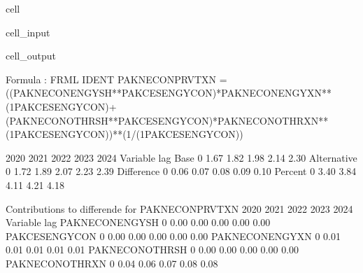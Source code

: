 \documentclass[letterpaper,10pt,english]{jupyterBook}
\begin{document}
\begin{sphinxuseclass}{cell}\begin{sphinxVerbatimInput}

\begin{sphinxuseclass}{cell_input}
\begin{sphinxVerbatim}[commandchars=\\\{\}]
\PYG{p}{[}\PYG{p}{]}
\end{sphinxVerbatim}

\end{sphinxuseclass}\end{sphinxVerbatimInput}
\begin{sphinxVerbatimOutput}

\begin{sphinxuseclass}{cell_output}
\begin{sphinxVerbatim}[commandchars=\\\{\}]
Formula        : FRML \PYGZlt{}IDENT\PYGZgt{} PAKNECONPRVTXN = ((PAKNECONENGYSH**PAKCESENGYCON)*PAKNECONENGYXN**(1\PYGZhy{}PAKCESENGYCON)+(PAKNECONOTHRSH**PAKCESENGYCON)*PAKNECONOTHRXN**(1\PYGZhy{}PAKCESENGYCON))**(1/(1\PYGZhy{}PAKCESENGYCON)) \PYGZdl{} 

                      2020       2021       2022       2023       2024
Variable    lag                                                       
Base        0         1.67       1.82       1.98       2.14       2.30
Alternative 0         1.72       1.89       2.07       2.23       2.39
Difference  0         0.06       0.07       0.08       0.09       0.10
Percent     0         3.40       3.84       4.11       4.21       4.18

 Contributions to differende for  PAKNECONPRVTXN
                         2020       2021       2022       2023       2024
Variable       lag                                                       
PAKNECONENGYSH 0        \PYGZhy{}0.00      \PYGZhy{}0.00      \PYGZhy{}0.00      \PYGZhy{}0.00      \PYGZhy{}0.00
PAKCESENGYCON  0        \PYGZhy{}0.00      \PYGZhy{}0.00      \PYGZhy{}0.00      \PYGZhy{}0.00      \PYGZhy{}0.00
PAKNECONENGYXN 0         0.01       0.01       0.01       0.01       0.01
PAKNECONOTHRSH 0        \PYGZhy{}0.00      \PYGZhy{}0.00      \PYGZhy{}0.00      \PYGZhy{}0.00      \PYGZhy{}0.00
PAKNECONOTHRXN 0         0.04       0.06       0.07       0.08       0.08


\end{sphinxVerbatim}
\end{sphinxuseclass}
\end{sphinxVerbatimOutput}
\end{sphinxuseclass}
\end{document}
